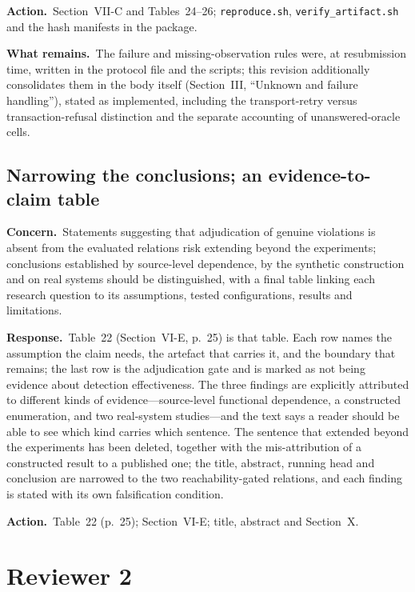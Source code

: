 \documentclass[10pt,letterpaper]{article}
\newcommand{\Concern}[1]{\par\smallskip\noindent\textbf{Concern.}\ #1\par}
\newcommand{\Response}[1]{\par\smallskip\noindent\textbf{Response.}\ #1\par}
\newcommand{\Action}[1]{\par\smallskip\noindent\textbf{Action.}\ #1\par}
\newcommand{\Remains}[1]{\par\smallskip\noindent\textbf{What remains.}\ #1\par}
\begin{document}
\Action{Section~VII-C and Tables~24--26; \texttt{reproduce.sh},
\texttt{verify\_artifact.sh} and the hash manifests in the package.}
\Remains{The failure and missing-observation rules were, at resubmission time,
written in the protocol file and the scripts; this revision additionally
consolidates them in the body itself (Section~III, ``Unknown and failure
handling''), stated as implemented, including the transport-retry versus
transaction-refusal distinction and the separate accounting of
unanswered-oracle cells.}

\subsection{Narrowing the conclusions; an evidence-to-claim table}
\Concern{Statements suggesting that adjudication of genuine violations is absent
from the evaluated relations risk extending beyond the experiments; conclusions
established by source-level dependence, by the synthetic construction and on real
systems should be distinguished, with a final table linking each research
question to its assumptions, tested configurations, results and limitations.}
\Response{Table~22 (Section~VI-E, p.~25) is that table. Each row names the
assumption the claim needs, the artefact that carries it, and the boundary that
remains; the last row is the adjudication gate and is marked as not being
evidence about detection effectiveness. The three findings are explicitly
attributed to different kinds of evidence---source-level functional dependence, a
constructed enumeration, and two real-system studies---and the text says a reader
should be able to see which kind carries which sentence. The sentence that
extended beyond the experiments has been deleted, together with the
mis-attribution of a constructed result to a published one; the title, abstract,
running head and conclusion are narrowed to the two reachability-gated relations,
and each finding is stated with its own falsification condition.}
\Action{Table~22 (p.~25); Section~VI-E; title, abstract and Section~X.}

\section{Reviewer 2}
\end{document}
